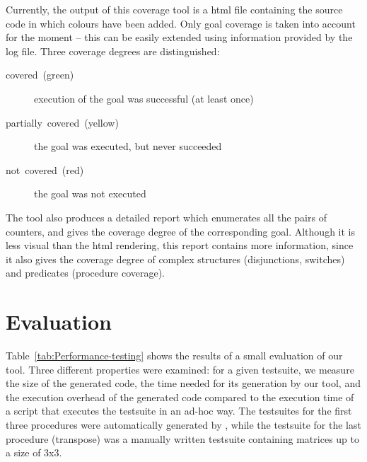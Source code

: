 \documentclass[british]{llncs}
\begin{document}
Currently, the output of this coverage tool is a html file containing the source code in which colours have been added. Only goal coverage is taken into account for the moment -- this can be easily extended using information provided by the log file. Three coverage degrees are distinguished: 
\begin{description}
\item [{covered~(green)}] execution of the goal was successful (at least once) 
\item [{partially~covered~(yellow)}] the goal was executed, but never succeeded 
\item [{not~covered~(red)}] the goal was not executed 
\end{description}
The tool also produces a detailed report which enumerates
all the pairs of counters, and gives the coverage degree of the corresponding
goal. Although it is less visual than the html rendering, this report contains more information, since it also gives the coverage degree of complex structures (disjunctions, switches) and predicates (procedure coverage).




\section{Evaluation}\label{eval}

Table~\ref{tab:Performance-testing} shows the results of a small evaluation of our tool.
Three different properties were examined: for a given testsuite, we measure the size of the generated code, the time needed for its generation by our tool, and the execution overhead of the generated code compared to the execution time of a script that executes the testsuite in an ad-hoc way. The testsuites for the first three procedures were automatically generated by \cite{DBLP:conf/lopstr/DegraveSV08}, while the testsuite for the last procedure (transpose) was a manually written testsuite containing matrices up to a size of 3x3.
\end{document}
